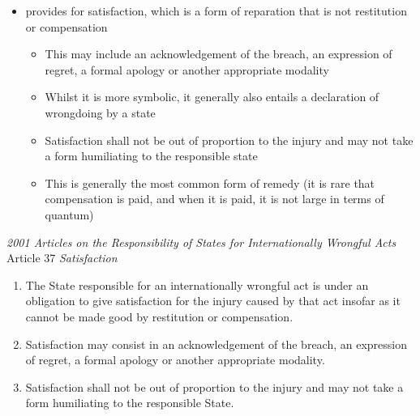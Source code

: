 \begin{itemize}
    \item {} provides for satisfaction, which is a form of reparation that is not restitution or compensation
    \begin{itemize}
        \item This may include an acknowledgement of the breach, an expression of regret, a formal apology or another appropriate modality
        \item Whilst it is more symbolic, it generally also entails a declaration of wrongdoing by a state
        \item Satisfaction shall not be out of proportion to the injury and may not take a form humiliating to the responsible state
        \item This is generally the most common form of remedy (it is rare that compensation is paid, and when it is paid, it is not large in terms of quantum)
    \end{itemize}
\end{itemize}

\begin{conventiondetails}{\textit{2001 Articles on the Responsibility of States for Internationally Wrongful Acts} Article 37}
    \flushleft
    \textit{Satisfaction}

    \begin{enumerate}
        \item The State responsible for an internationally wrongful act is under an obligation to give satisfaction for the injury caused by that act insofar as it cannot be made good by restitution or compensation.
        \item Satisfaction may consist in an acknowledgement of the breach, an expression of regret, a formal apology or another appropriate modality.
        \item Satisfaction shall not be out of proportion to the injury and may not take a form humiliating to the responsible State.
    \end{enumerate}
\end{conventiondetails}